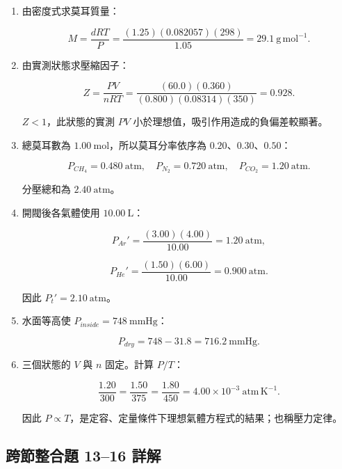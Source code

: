 \documentclass[11pt,a4paper]{article}
\begin{document}
\begin{enumerate}
\def\labelenumi{\arabic{enumi}.}
\setcounter{enumi}{6}
\item
  由密度式求莫耳質量：

  \[
  M=\frac{dRT}{P}
  =\frac{(1.25)(0.082057)(298)}{1.05}
  =29.1\ \mathrm{g\,mol^{-1}}.
  \]
\item
  由實測狀態求壓縮因子：

  \[
  Z=\frac{PV}{nRT}
  =\frac{(60.0)(0.360)}{(0.800)(0.08314)(350)}
  =0.928.
  \]

  \(Z<1\)，此狀態的實測 \(PV\) 小於理想值，吸引作用造成的負偏差較顯著。
\item
  總莫耳數為 \(1.00\ \mathrm{mol}\)，所以莫耳分率依序為 \(0.20\)、\(0.30\)、\(0.50\)：

  \[
  P_{CH_4}=0.480\ \mathrm{atm},\quad
  P_{N_2}=0.720\ \mathrm{atm},\quad
  P_{CO_2}=1.20\ \mathrm{atm}.
  \]

  分壓總和為 \(2.40\ \mathrm{atm}\)。
\item
  開閥後各氣體使用 \(10.00\ \mathrm L\)：

  \[
  P_{Ar}'=\frac{(3.00)(4.00)}{10.00}=1.20\ \mathrm{atm},
  \]

  \[
  P_{He}'=\frac{(1.50)(6.00)}{10.00}=0.900\ \mathrm{atm}.
  \]

  因此 \(P_t'=2.10\ \mathrm{atm}\)。
\item
  水面等高使 \(P_{inside}=748\ \mathrm{mmHg}\)：

  \[
  P_{dry}=748-31.8=716.2\ \mathrm{mmHg}.
  \]
\item
  三個狀態的 \(V\) 與 \(n\) 固定。計算 \(P/T\)：

  \[
  \frac{1.20}{300}=\frac{1.50}{375}=\frac{1.80}{450}=4.00\times10^{-3}\ \mathrm{atm\,K^{-1}}.
  \]

  因此 \(P\propto T\)，是定容、定量條件下理想氣體方程式的結果；也稱壓力定律。
\end{enumerate}

\subsection{跨節整合題 13--16 詳解}\label{ux8de8ux7bc0ux6574ux5408ux984c-1316-ux8a73ux89e3}
\end{document}
